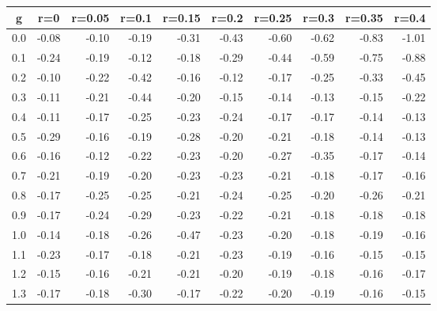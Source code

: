 %
\begin{table}[!tbp]
 \begin{center}
 \begin{tabular}{rrrrrrrrrr}\hline\hline
\multicolumn{1}{c}{g}&\multicolumn{1}{c}{r=0}&\multicolumn{1}{c}{r=0.05}&\multicolumn{1}{c}{r=0.1}&\multicolumn{1}{c}{r=0.15}&\multicolumn{1}{c}{r=0.2}&\multicolumn{1}{c}{r=0.25}&\multicolumn{1}{c}{r=0.3}&\multicolumn{1}{c}{r=0.35}&\multicolumn{1}{c}{r=0.4}\tabularnewline
\hline
0.0&-0.08&-0.10&-0.19&-0.31&-0.43&-0.60&-0.62&-0.83&-1.01\tabularnewline
0.1&-0.24&-0.19&-0.12&-0.18&-0.29&-0.44&-0.59&-0.75&-0.88\tabularnewline
0.2&-0.10&-0.22&-0.42&-0.16&-0.12&-0.17&-0.25&-0.33&-0.45\tabularnewline
0.3&-0.11&-0.21&-0.44&-0.20&-0.15&-0.14&-0.13&-0.15&-0.22\tabularnewline
0.4&-0.11&-0.17&-0.25&-0.23&-0.24&-0.17&-0.17&-0.14&-0.13\tabularnewline
0.5&-0.29&-0.16&-0.19&-0.28&-0.20&-0.21&-0.18&-0.14&-0.13\tabularnewline
0.6&-0.16&-0.12&-0.22&-0.23&-0.20&-0.27&-0.35&-0.17&-0.14\tabularnewline
0.7&-0.21&-0.19&-0.20&-0.23&-0.23&-0.21&-0.18&-0.17&-0.16\tabularnewline
0.8&-0.17&-0.25&-0.25&-0.21&-0.24&-0.25&-0.20&-0.26&-0.21\tabularnewline
0.9&-0.17&-0.24&-0.29&-0.23&-0.22&-0.21&-0.18&-0.18&-0.18\tabularnewline
1.0&-0.14&-0.18&-0.26&-0.47&-0.23&-0.20&-0.18&-0.19&-0.16\tabularnewline
1.1&-0.23&-0.17&-0.18&-0.21&-0.23&-0.19&-0.16&-0.15&-0.15\tabularnewline
1.2&-0.15&-0.16&-0.21&-0.21&-0.20&-0.19&-0.18&-0.16&-0.17\tabularnewline
1.3&-0.17&-0.18&-0.30&-0.17&-0.22&-0.20&-0.19&-0.16&-0.15\tabularnewline
\hline
\end{tabular}

\end{center}

\end{table}

